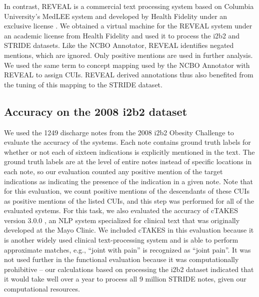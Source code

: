 In contrast, REVEAL is a commercial text processing system based on
Columbia University’s MedLEE system and developed by Health Fidelity
under an exclusive license \cite{HealthFidelity}.  We obtained a
virtual machine for the REVEAL system under an academic license from
Health Fidelity and used it to process the i2b2 and STRIDE datasets.
Like the NCBO Annotator, REVEAL identifies negated mentions, which are
ignored.  Only positive mentions are used in further analysis.  We
used the same term to concept mapping used by the NCBO Annotator with
REVEAL to assign CUIs.  REVEAL derived annotations thus also benefited
from the tuning of this mapping to the STRIDE dataset.

\subsection{Accuracy on the 2008 i2b2 dataset}
We used the 1249 discharge notes from the 2008 i2b2 Obesity Challenge
to evaluate the accuracy of the systems.  Each note contains ground
truth labels for whether or not each of sixteen indications is
explicitly mentioned in the text.  The ground truth labels are at the
level of entire notes instead of specific locations in each note, so
our evaluation counted any positive mention of the target indications
as indicating the presence of the indication in a given note.  Note
that for this evaluation, we count positive mentions of the
descendants of these CUIs as positive mentions of the listed CUIs, and
this step was performed for all of the evaluated systems.  For this
task, we also evaluated the accuracy of cTAKES version 3.0.0
\cite{Savova2010}, an NLP system specialized for clinical text that
was originally developed at the Mayo Clinic.  We included cTAKES in
this evaluation because it is another widely used clinical
text-processing system and is able to perform approximate matches,
e.g., “joint with pain” is recognized as “joint pain”.  It was not
used further in the functional evaluation because it was
computationally prohibitive – our calculations based on processing the
i2b2 dataset indicated that it would take well over a year to process
all 9 million STRIDE notes, given our computational resources.

